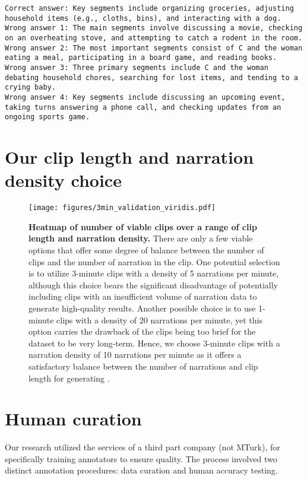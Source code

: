 \begin{lstlisting}
Correct answer: Key segments include organizing groceries, adjusting household items (e.g., cloths, bins), and interacting with a dog.
Wrong answer 1: The main segments involve discussing a movie, checking on an overheating stove, and attempting to catch a rodent in the room.
Wrong answer 2: The most important segments consist of C and the woman eating a meal, participating in a board game, and reading books.
Wrong answer 3: Three primary segments include C and the woman debating household chores, searching for lost items, and tending to a crying baby.
Wrong answer 4: Key segments include discussing an upcoming event, taking turns answering a phone call, and checking updates from an ongoing sports game.
\end{lstlisting}\clearpage

\section{Our clip length and narration density choice}
\label{sec:viable_clips}
\begin{figure}[h!]
    \centering
    \texttt{[image: figures/3min\_validation\_viridis.pdf]}
    \caption{\small \textbf{Heatmap of number of viable clips over a range of clip length and narration density.} There are only a few viable options that offer some degree of balance between the number of clips and the number of narration in the clip. One potential selection is to utilize 3-minute clips with a density of 5 narrations per minute, although this choice bears the significant disadvantage of potentially including clips with an insufficient volume of narration data to generate high-quality results. Another possible choice is to use 1-minute clips with a density of 20 narrations per minute, yet this option carries the drawback of the clips being too brief for the dataset to be very long-term. Hence, we choose 3-minute clips with a narration density of 10 narrations per minute as it offers a satisfactory balance between the number of narrations and clip length for generating \name{}{}.}
\end{figure}

\section{Human curation}
\label{sec:quantigo}
Our research utilized the services of a third part company (not MTurk), for specifically training annotators to ensure quality. The process involved two distinct annotation procedures: data curation and human accuracy testing.

